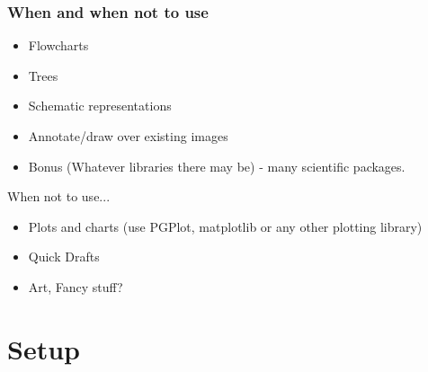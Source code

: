 \documentclass{beamer}
\begin{document}

\begin{frame}
    
\end{frame}


\begin{frame}
    \begin{figure}
        
    \end{figure}
\end{frame}


\begin{frame}
    \frametitle{When and when not to use}

    \begin{itemize}
        \item Flowcharts
        \item Trees
        \item Schematic representations
        \item Annotate/draw over existing images
        \item Bonus (Whatever libraries there may be) - many scientific packages.
     \end{itemize}

     \begin{block}{When not to use...}
     \begin{itemize}
         \item Plots and charts (use PGPlot, matplotlib or any other plotting library)
         \item Quick Drafts
         \item Art, Fancy stuff?
     \end{itemize}
    \end{block}
\end{frame}


\section{Setup}
\end{document}
